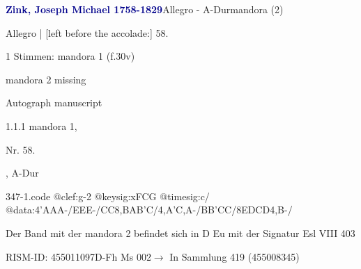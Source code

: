\documentclass[twocolumn]{book}
\begin{document}
\par \vspace{7pt} \textcolor{darkblue}{\textbf{Zink, Joseph Michael  1758-1829}}\hfillplus{\textbf{[347]}}\newline Allegro - A-Dur\newline mandora (2)
\par \begin{itshape}[f.30v, at left:] Allegro | [left before the accolade:] 58.\end{itshape} 
\par \textcolor{darkblue}{}  1 Stimmen: mandora 1  (f.30v)\newline \begin{small} mandora 2 missing\end{small} \newline Autograph manuscript
\par 1.1.1  mandora 1, \begin{itshape}Nr. 58.\end{itshape}, A-Dur  
\begin{filecontents*}{347-1.code}
@clef:g-2
@keysig:xFCG
@timesig:c/
@data:4'AAA-/EEE-/CC8,BAB'C/4,A'C,A-/BB'CC/8EDCD4,B-/
\end{filecontents*}
\newline
%
\par Der Band mit der mandora 2 befindet sich in D Eu mit der Signatur Esl VIII 403
\par RISM-ID: 455011097\newline D-Fh  Ms 002\newline $\rightarrow$ In Sammlung 419 (455008345)
      
\end{document}
